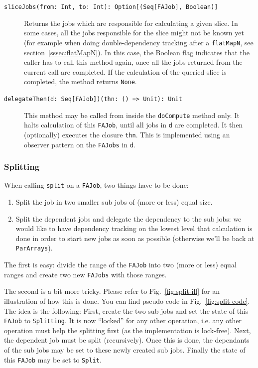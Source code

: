 \documentclass[runningheads,a4paper,fleqn]{llncs}
\begin{document}
\begin{description}
  \item[\texttt{sliceJobs(from: Int, to: Int): Option[(Seq[FAJob],
      Boolean)]}] Returns the jobs which are responsible for
    calculating a given slice. In some cases, all the jobs responsible
    for the slice might not be known yet (for example when doing
    double-dependency tracking after a \texttt{flatMapN}, see
    section~\ref{sssec:flatMapN}). In this case, the Boolean flag
    indicates that the caller has to call this method again, once all
    the jobs returned from the current call are completed. If the
    calculation of the queried slice is completed, the method returns
    \texttt{None}.
  \item[\texttt{delegateThen(d: Seq[FAJob])(thn: () => Unit): Unit}]
    This method may be called from inside the \texttt{doCompute}
    method only. It halts calculation of this \texttt{FAJob}, until
    all jobs in \texttt{d} are completed. It then (optionally)
    executes the closure \texttt{thn}. This is implemented using an
    observer pattern on the \texttt{FAJobs} in \texttt{d}.
\end{description}

\subsubsection{Splitting}
When calling \texttt{split} on a \texttt{FAJob}, two things have to be
done:
\begin{enumerate}
\item Split the job in two smaller sub jobs of (more or less) equal
  size.
\item Split the dependent jobs and delegate the dependency to the
  sub jobs: we would like to have dependency tracking on the lowest
  level that calculation is done in order to start new jobs as soon as
  possible (otherwise we'll be back at \texttt{ParArrays}).
\end{enumerate}

The first is easy: divide the range of the \texttt{FAJob} into two
(more or less) equal ranges and create two new \texttt{FAJobs} with
those ranges.

The second is a bit more tricky. Please refer to Fig.~\ref{fig:split-ill}
for an illustration of how this is done. You can find pseudo code in
Fig.~\ref{fig:split-code}. The idea is the following: First, create the
two sub jobs and set the state of this \texttt{FAJob} to
\texttt{Splitting}. It is now ``locked'' for any other operation,
i.e. any
other operation must help the splitting first (as the implementation
is lock-free). Next, the dependent job must be split
(recursively). Once this is done, the dependants of the sub jobs may be
set to these newly created sub jobs. Finally the state of this
\texttt{FAJob} may be set to \texttt{Split}.
\end{document}
